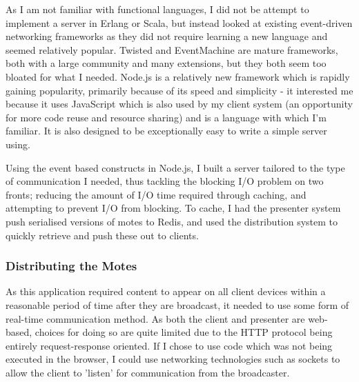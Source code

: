 \documentclass[a4papert,11pt,notitlepage]{ltxdoc}
\begin{document}
As I am not familiar with functional languages, I did not be attempt to implement a server in Erlang or Scala, but instead looked at existing event-driven networking frameworks as they did not require learning a new language and seemed relatively popular. Twisted and EventMachine are mature frameworks, both with a large community and many extensions, but they both seem too bloated for what I needed. Node.js is a relatively new framework which is rapidly gaining popularity, primarily because of its speed and simplicity - it interested me because it uses JavaScript which is also used by my client system (an opportunity for more code reuse and resource sharing) and is a language with which I'm familiar. It is also designed to be exceptionally easy to write a simple server using.

Using the event based constructs in Node.js, I built a server tailored to the type of communication I needed, thus tackling the blocking I/O problem on two fronts; reducing the amount of I/O time required through caching, and attempting to prevent I/O from blocking. To cache, I had the presenter system push serialised versions of motes to Redis, and used the distribution system to quickly retrieve and push these out to clients.


\subsubsection{Distributing the Motes}
As this application required content to appear on all client devices within a reasonable period of time after they are broadcast, it needed to use some form of real-time communication method. As both the client and presenter are web-based, choices for doing so are quite limited due to the HTTP protocol being entirely request-response oriented. If I chose to use code which was not being executed in the browser, I could use networking technologies such as sockets to allow the client to 'listen' for communication from the broadcaster.
\end{document}
